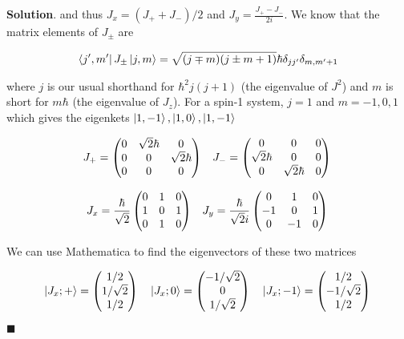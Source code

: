 \documentclass[12pt]{article}
\theoremstyle{definition}
\newenvironment{s}{%
        \begin{trivlist} \item \textbf{Solution}. }{%
            \hspace*{\fill} $\blacksquare$\end{trivlist}}%
\begin{document}
{\begin{s}
and thus $J_{x} = (J_{+} + J_{-})/2$ and $J_{y} = \frac{J_{+}-J_{-}}{2i}$. We know that the matrix elements of $J_{\pm}$ are

\begin{align*}
\bra{j',m'}J_{\pm}\ket{j,m} = \sqrt{(j\mp m)(j\pm m + 1)}\hbar\delta_{jj'}\delta_{m,m'+1}
\end{align*}

where $j$ is our usual shorthand for $\hbar^{2}j(j+1)$ (the eigenvalue of $J^{2}$) and $m$ is short for $m\hbar$ (the eigenvalue of $J_{z}$). For a spin-1 system, $j=1$ and $m = -1, 0, 1$ which gives the eigenkets $\ket{1,-1},\ket{1,0},\ket{1,-1}$

\begin{equation*}
J_{+} =
\begin{pmatrix}
0&\sqrt{2}\hbar&0\\
0&0&\sqrt{2}\hbar\\
0&0&0
\end{pmatrix}\\ \;\;\;
J_{-} =
\begin{pmatrix}
0&0&0\\
\sqrt{2}\hbar&0&0\\
0&\sqrt{2}\hbar&0
\end{pmatrix}\\ 
\end{equation*}


\begin{equation*}
J_{x} =
\frac{\hbar}{\sqrt{2}}\begin{pmatrix}
0&1&0\\
1&0&1\\
0&1&0
\end{pmatrix}\\ \;\;\;
J_{y} =
\frac{\hbar}{\sqrt{2}i}\begin{pmatrix}
0&1&0\\
-1&0&1\\
0&-1&0
\end{pmatrix}\\ 
\end{equation*}

We can use Mathematica to find the eigenvectors of these two matrices

\begin{equation*}
\ket{J_{x}; +} =
\begin{pmatrix}
1/2\\
1/\sqrt{2}\\
1/2
\end{pmatrix}\\ \;\;\;
\ket{J_{x}; 0} =
\begin{pmatrix}
-1/\sqrt{2}\\
0\\
1/\sqrt{2}
\end{pmatrix}\\ \;\;\;
\ket{J_{x}; -1} =
\begin{pmatrix}
1/2\\
-1/\sqrt{2}\\
1/2
\end{pmatrix}\\ 
\end{equation*}


\end{s}}
\end{document}
